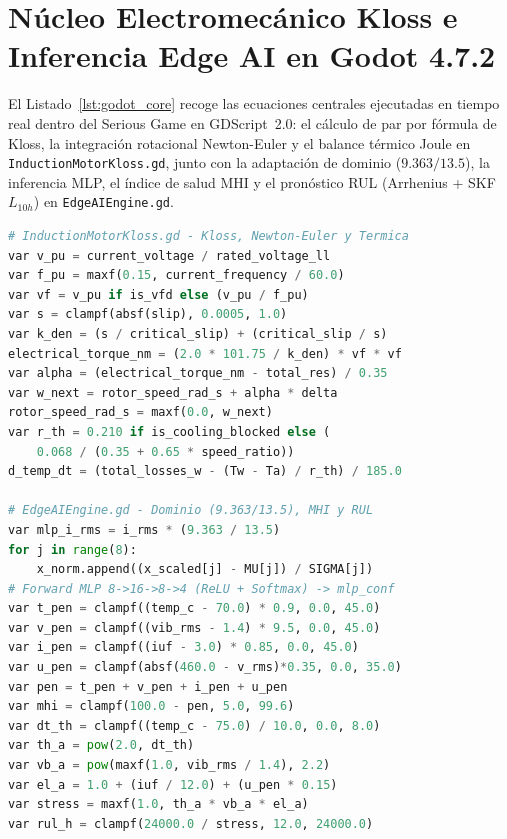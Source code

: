 \section{N\'ucleo Electromec\'anico Kloss e Inferencia Edge AI en Godot 4.7.2}\label{app:godot}

El Listado~\ref{lst:godot_core} recoge las ecuaciones centrales ejecutadas en
tiempo real dentro del Serious Game en GDScript~2.0: el c\'alculo de par por
f\'ormula de Kloss, la integraci\'on rotacional Newton-Euler y el balance
t\'ermico Joule en \texttt{InductionMotorKloss.gd}, junto con la adaptaci\'on
de dominio ($9.363/13.5$), la inferencia MLP, el \'indice de salud MHI y el
pron\'ostico RUL (Arrhenius + SKF~$L_{10h}$) en \texttt{EdgeAIEngine.gd}.

\begin{lstlisting}[language=Python,float=htbp,numbers=none,breaklines=true,xleftmargin=0pt,xrightmargin=0pt,caption={Extracto verificado de \texttt{InductionMotorKloss.gd} y \texttt{EdgeAIEngine.gd} en Godot~4.7.2 (GDScript~2.0).},label={lst:godot_core}]
# InductionMotorKloss.gd - Kloss, Newton-Euler y Termica
var v_pu = current_voltage / rated_voltage_ll
var f_pu = maxf(0.15, current_frequency / 60.0)
var vf = v_pu if is_vfd else (v_pu / f_pu)
var s = clampf(absf(slip), 0.0005, 1.0)
var k_den = (s / critical_slip) + (critical_slip / s)
electrical_torque_nm = (2.0 * 101.75 / k_den) * vf * vf
var alpha = (electrical_torque_nm - total_res) / 0.35
var w_next = rotor_speed_rad_s + alpha * delta
rotor_speed_rad_s = maxf(0.0, w_next)
var r_th = 0.210 if is_cooling_blocked else (
    0.068 / (0.35 + 0.65 * speed_ratio))
d_temp_dt = (total_losses_w - (Tw - Ta) / r_th) / 185.0

# EdgeAIEngine.gd - Dominio (9.363/13.5), MHI y RUL
var mlp_i_rms = i_rms * (9.363 / 13.5)
for j in range(8):
    x_norm.append((x_scaled[j] - MU[j]) / SIGMA[j])
# Forward MLP 8->16->8->4 (ReLU + Softmax) -> mlp_conf
var t_pen = clampf((temp_c - 70.0) * 0.9, 0.0, 45.0)
var v_pen = clampf((vib_rms - 1.4) * 9.5, 0.0, 45.0)
var i_pen = clampf((iuf - 3.0) * 0.85, 0.0, 45.0)
var u_pen = clampf(absf(460.0 - v_rms)*0.35, 0.0, 35.0)
var pen = t_pen + v_pen + i_pen + u_pen
var mhi = clampf(100.0 - pen, 5.0, 99.6)
var dt_th = clampf((temp_c - 75.0) / 10.0, 0.0, 8.0)
var th_a = pow(2.0, dt_th)
var vb_a = pow(maxf(1.0, vib_rms / 1.4), 2.2)
var el_a = 1.0 + (iuf / 12.0) + (u_pen * 0.15)
var stress = maxf(1.0, th_a * vb_a * el_a)
var rul_h = clampf(24000.0 / stress, 12.0, 24000.0)
\end{lstlisting}

